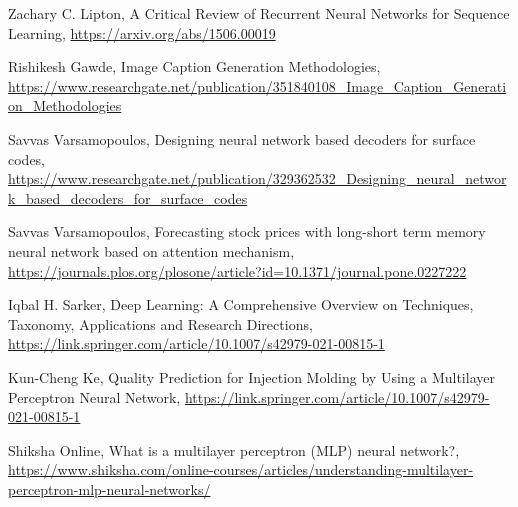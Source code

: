 \documentclass{ieeeojies}
\begin{document}
\begin{thebibliography}{00}
    Zachary C. Lipton,
    A Critical Review of Recurrent Neural Networks for Sequence Learning, \url{https://arxiv.org/abs/1506.00019}
    
    Rishikesh Gawde,
    Image Caption Generation Methodologies, \url{https://www.researchgate.net/publication/351840108_Image_Caption_Generation_Methodologies}
    
    Savvas Varsamopoulos,
    Designing neural network based decoders for surface codes, \url{https://www.researchgate.net/publication/329362532_Designing_neural_network_based_decoders_for_surface_codes}

    Savvas Varsamopoulos,
    Forecasting stock prices with long-short term memory neural network based on attention mechanism,
    \url{https://journals.plos.org/plosone/article?id=10.1371/journal.pone.0227222}

    Iqbal H. Sarker,
    Deep Learning: A Comprehensive Overview on Techniques, Taxonomy, Applications and Research Directions,
    \url{https://link.springer.com/article/10.1007/s42979-021-00815-1}

    Kun-Cheng Ke,
    Quality Prediction for Injection Molding by Using a Multilayer Perceptron Neural Network,
    \url{https://link.springer.com/article/10.1007/s42979-021-00815-1}

    Shiksha Online,
    What is a multilayer perceptron (MLP) neural network?,
    \url{https://www.shiksha.com/online-courses/articles/understanding-multilayer-perceptron-mlp-neural-networks/}

\end{thebibliography}

\EOD
\end{document}
